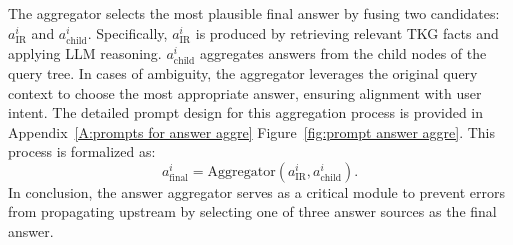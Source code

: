 \documentclass[11pt]{article}
\begin{document}
The aggregator selects the most plausible final answer by fusing two candidates:  \( a^i_{\text{IR}} \) and \( a^i_{\text{child}} \). Specifically, \( a^i_{\text{IR}} \) is produced by retrieving relevant TKG facts and applying LLM reasoning. \( a^i_{\text{child}} \) aggregates answers from the child nodes of the query tree. 
In cases of ambiguity, the aggregator leverages the original query context to choose the most appropriate answer, ensuring alignment with user intent. The detailed prompt design for this aggregation process is provided in Appendix~\ref{A:prompts for answer aggre} Figure~\ref{fig:prompt answer aggre}. This process is formalized as:
\begin{equation}
    a_{\text{final}}^i = \text{Aggregator}(a^i_{\text{IR}}, a^i_{\text{child}}).
\end{equation}
In conclusion, the answer aggregator serves as a critical module to prevent errors from propagating upstream by selecting one of three answer sources as the final answer.
\end{document}
